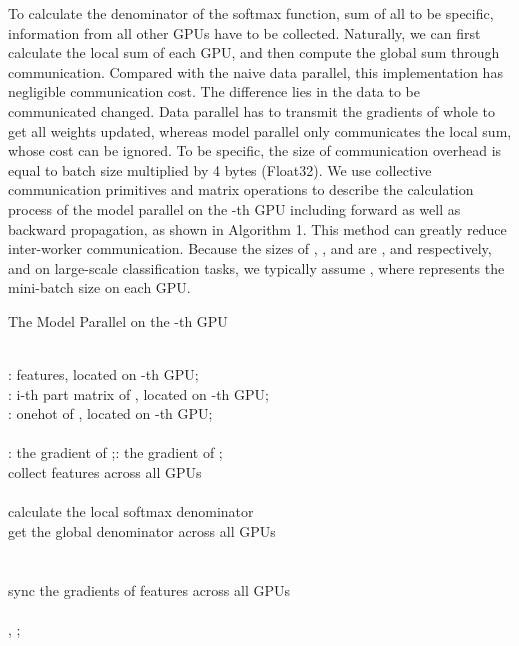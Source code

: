 \documentclass[letterpaper]{article} \usepackage{style/aaai21}  \usepackage{times}  \usepackage{helvet} \usepackage{courier}  \usepackage[hyphens]{url}  \usepackage{graphicx} \usepackage{color}
\begin{document}
To calculate the denominator of the softmax function, sum of all  to be specific, information from all other GPUs have to be collected. Naturally, we can first calculate the local sum of each GPU, and then compute the global sum through communication. Compared with the naive data parallel, this implementation has negligible communication cost. The difference lies in the data to be communicated changed. Data parallel has to transmit the gradients of whole  to get all weights updated, whereas model parallel only communicates the local sum, whose cost can be ignored. To be specific, the size of communication overhead is equal to batch size multiplied by 4 bytes (Float32). We use collective communication primitives and matrix operations to describe the calculation process of the model parallel on the -th GPU including forward as well as backward propagation, as shown in Algorithm 1. This method can greatly reduce inter-worker communication. Because the sizes of , , and  are ,  and  respectively, and on large-scale classification tasks, we typically assume , where  represents the mini-batch size on each GPU.
\begin{algorithm}[t]
 \caption{The Model Parallel on the -th GPU}
 \begin{algorithmic}[1]
  \REQUIRE ~~\\ 
  	{}  : features, located on -th GPU;                \\
	{}  : i-th part matrix of , located on -th GPU;          \\
  	{}  : onehot of , located on -th GPU;   \\
  \ENSURE ~~\\ 
  	: the gradient of ;\quad : the gradient of ;\\
    \STATE  collect features across all GPUs 
    \STATE   \\
    \STATE  \\  
    \STATE  calculate the local softmax denominator 
    \STATE  \\  
    \STATE  get the global denominator across all GPUs 
    \STATE \\ \STATE  
    \STATE  \\
    \STATE  \\ 
    \STATE  sync the gradients of features across all GPUs 
    \STATE  \\
    \STATE \\
    \RETURN , \quad ; 
  \end{algorithmic}
\end{algorithm}
\end{document}
